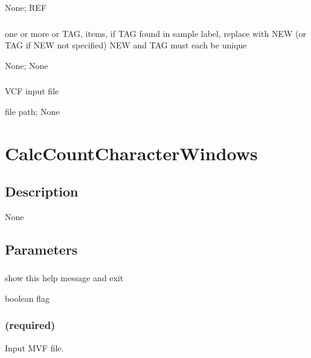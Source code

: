 \documentclass[letterpaper,11pt,english]{sphinxmanual}
\begin{document}
 None;  REF


\subsubsection{}
\label{\detokenize{prog_desc:samplereplace}}
 one or more  or TAG, items, if TAG found in sample label, replace with NEW (or TAG if NEW not specified) NEW and TAG must each be unique

 None;  None


\subsubsection{}
\label{\detokenize{prog_desc:vcf}}
 VCF input file

 file path;  None


\section{CalcCountCharacterWindows}
\label{\detokenize{prog_desc:calccountcharacterwindows}}

\subsection{Description}
\label{\detokenize{prog_desc:id38}}
None


\subsection{Parameters}
\label{\detokenize{prog_desc:id39}}

\subsubsection{}
\label{\detokenize{prog_desc:id40}}
 show this help message and exit

 boolean flag


\subsubsection{ (required)}
\label{\detokenize{prog_desc:id41}}
 Input MVF file.
\end{document}
